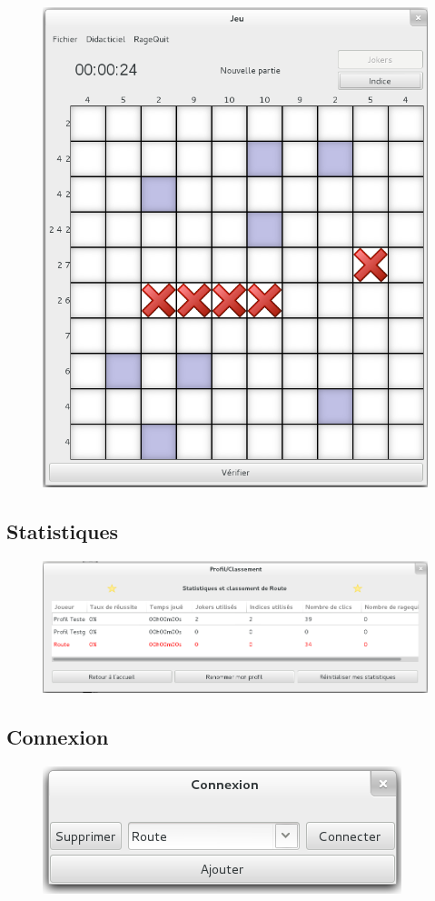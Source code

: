 \documentclass[a4paper, 12pt, twoside]{article}
\begin{document}
\begin{figure}[H]
  \center
  \includegraphics[scale=0.6]{jeu.png}
  \label{jeu}
\end{figure}
\newpage
\subsection{Statistiques}

\begin{figure}[H]
  \center
  \includegraphics[scale=0.4]{stats.png}
  \label{stats}
\end{figure}

\bigbreak

\subsection{Connexion}

\begin{figure}[H]
  \center
  \includegraphics[scale=0.8]{connexion.png}
  \label{connexion}
\end{figure}
\end{document}
